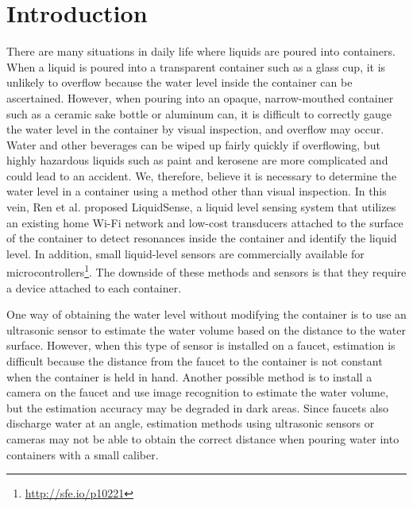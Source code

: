 \documentclass[sigconf]{acmart}
\begin{document}
\section{Introduction}
There are many situations in daily life where liquids are poured into containers. When a liquid is poured into a transparent container such as a glass cup, it is unlikely to overflow because the water level inside the container can be ascertained. However, when pouring into an opaque, narrow-mouthed container such as a ceramic sake bottle or aluminum can, it is difficult to correctly gauge the water level in the container by visual inspection, and overflow may occur. Water and other beverages can be wiped up fairly quickly if overflowing, but highly hazardous liquids such as paint and kerosene are more complicated and could lead to an accident. We, therefore, believe it is necessary to determine the water level in a container using a method other than visual inspection. In this vein, Ren et al.\cite{LiquidSense} proposed LiquidSense, a liquid level sensing system that utilizes an existing home Wi-Fi network and low-cost transducers attached to the surface of the container to detect resonances inside the container and identify the liquid level. In addition, small liquid-level sensors are commercially available for microcontrollers\footnote{\url{http://sfe.io/p10221}}. The downside of these methods and sensors is that they require a device attached to each container.\par

One way of obtaining the water level without modifying the container is to use an ultrasonic sensor to estimate the water volume based on the distance to the water surface\cite{smart_faucet1}. However, when this type of sensor is installed on a faucet, estimation is difficult because the distance from the faucet to the container is not constant when the container is held in hand. Another possible method is to install a camera on the faucet and use image recognition to estimate the water volume, but the estimation accuracy may be degraded in dark areas. Since faucets also discharge water at an angle, estimation methods using ultrasonic sensors or cameras may not be able to obtain the correct distance when pouring water into containers with a small caliber.\par
\end{document}
